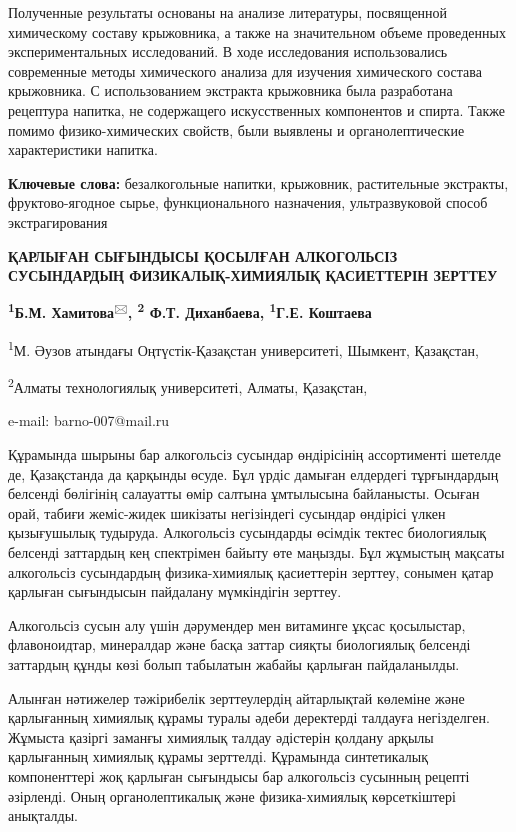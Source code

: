 Полученные результаты основаны на анализе литературы, посвященной
химическому составу крыжовника, а также на значительном объеме
проведенных экспериментальных исследований. В ходе исследования
использовались современные методы химического анализа для изучения
химического состава крыжовника. С использованием экстракта крыжовника
была разработана рецептура напитка, не содержащего искусственных
компонентов и спирта. Также помимо физико-химических свойств, были
выявлены и органолептические характеристики напитка.

{\bfseries Ключевые слова:} безалкогольные напитки, крыжовник, растительные
экстракты, фруктово-ягодное сырье, функционального назначения,
ультразвуковой способ экстрагирования

{\bfseries ҚАРЛЫҒАН СЫҒЫНДЫСЫ ҚОСЫЛҒАН АЛКОГОЛЬСІЗ СУСЫНДАРДЫҢ
ФИЗИКАЛЫҚ-ХИМИЯЛЫҚ ҚАСИЕТТЕРІН ЗЕРТТЕУ}

{\bfseries \textsuperscript{1}Б.М. Хамитова}\textsuperscript{🖂}{\bfseries ,
\textsuperscript{2} Ф.Т. Диханбаева, \textsuperscript{1}Г.Е. Коштаева}

\textsuperscript{1}М. Әузов атындағы Оңтүстік-Қазақстан университеті,
Шымкент, Қазақстан,

\textsuperscript{2}Алматы технологиялық университеті, Алматы, Қазақстан,

e-mail: barno-007@mail.ru

Құрамында шырыны бар алкогольсіз сусындар өндірісінің ассортименті
шетелде де, Қазақстанда да қарқынды өсуде. Бұл үрдіс дамыған елдердегі
тұрғындардың белсенді бөлігінің салауатты өмір салтына ұмтылысына
байланысты. Осыған орай, табиғи жеміс-жидек шикізаты негізіндегі
сусындар өндірісі үлкен қызығушылық тудыруда. Алкогольсіз сусындарды
өсімдік тектес биологиялық белсенді заттардың кең спектрімен байыту өте
маңызды. Бұл жұмыстың мақсаты алкогольсіз сусындардың физика-химиялық
қасиеттерін зерттеу, сонымен қатар қарлыған сығындысын пайдалану
мүмкіндігін зерттеу.

Алкогольсіз сусын алу үшін дәрумендер мен витаминге ұқсас қосылыстар,
флавоноидтар, минералдар және басқа заттар сияқты биологиялық белсенді
заттардың құнды көзі болып табылатын жабайы қарлыған пайдаланылды.

Алынған нәтижелер тәжірибелік зерттеулердің айтарлықтай көлеміне және
қарлығанның химиялық құрамы туралы әдеби деректерді талдауға
негізделген. Жұмыста қазіргі заманғы химиялық талдау әдістерін қолдану
арқылы қарлығанның химиялық құрамы зерттелді. Құрамында синтетикалық
компоненттері жоқ қарлыған сығындысы бар алкогольсіз сусынның рецепті
әзірленді. Оның органолептикалық және физика-химиялық көрсеткіштері
анықталды.

